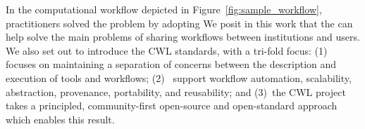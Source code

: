 \documentclass[sigconf,authordraft]{acmart}
\begin{document}
In the computational workflow depicted in Figure~\ref{fig:sample_workflow}, practitioners solved the problem by adopting  We posit in this work that the   can help solve the main problems of sharing workflows between institutions and users.  We also set out to introduce the CWL standards, with a tri-fold focus: (1)~ focuses on maintaining a separation of concerns between the description and execution of tools and workflows; (2)~ support workflow automation, scalability, abstraction, provenance, portability, and reusability; and (3)~the CWL project takes a principled, community-first open-source and open-standard approach which enables this result.
\end{document}
